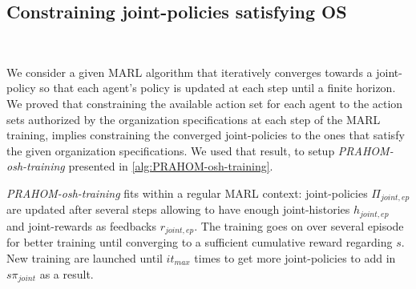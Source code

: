 \documentclass{ecai}
\newcounter{relation}
\newcounter{proof}
\begin{document}

%
%
%
%



\subsection{\textbf{Constraining joint-policies satisfying OS}}

\

We consider a given MARL algorithm that iteratively converges towards a joint-policy so that each agent's policy is updated at each step until a finite horizon.
We proved that constraining the available action set for each agent to the action sets authorized by the organization specifications at each step of the MARL training, implies constraining the converged joint-policies to the ones that satisfy the given organization specifications. We used that result, to setup \emph{PRAHOM-osh-training} presented in \autoref{alg:PRAHOM-osh-training}.

\emph{PRAHOM-osh-training} fits within a regular MARL context: joint-policies $\Pi_{joint,ep}$ are updated after several steps allowing to have enough joint-histories $h_{joint,ep}$ and joint-rewards as feedbacks $r_{joint,ep}$. The training goes on over several episode for better training until converging to a sufficient cumulative reward regarding $s$. New training are launched until $it_{max}$ times to get more joint-policies to add in $s\pi_{joint}$ as a result.
\end{document}

